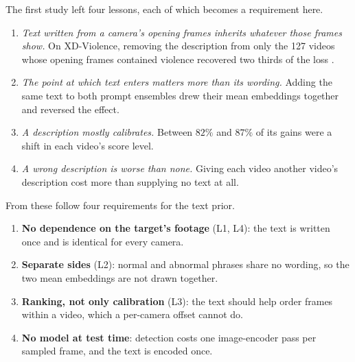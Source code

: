 \documentclass[a4paper,fleqn]{cas-sc}
\begin{document}
The first study left four lessons, each of which becomes a requirement here.

\begin{enumerate}[L1.]
  \item \emph{Text written from a camera's opening frames inherits whatever those
        frames show.} On XD-Violence, removing the description from only the 127
        videos whose opening frames contained violence recovered two thirds of the
        loss \citep{sarangi2026concept}.
  \item \emph{The point at which text enters matters more than its wording.} Adding
        the same text to both prompt ensembles drew their mean embeddings together
        and reversed the effect.
  \item \emph{A description mostly calibrates.} Between $82\%$ and $87\%$ of its
        gains were a shift in each video's score level.
  \item \emph{A wrong description is worse than none.} Giving each video another
        video's description cost more than supplying no text at all.
\end{enumerate}

From these follow four requirements for the text prior.

\begin{enumerate}[R1.]
  \item \textbf{No dependence on the target's footage} (L1, L4): the text is written
        once and is identical for every camera.
  \item \textbf{Separate sides} (L2): normal and abnormal phrases share no wording,
        so the two mean embeddings are not drawn together.
  \item \textbf{Ranking, not only calibration} (L3): the text should help order frames
        within a video, which a per-camera offset cannot do.
  \item \textbf{No model at test time}: detection costs one image-encoder pass per
        sampled frame, and the text is encoded once.
\end{enumerate}
\end{document}
